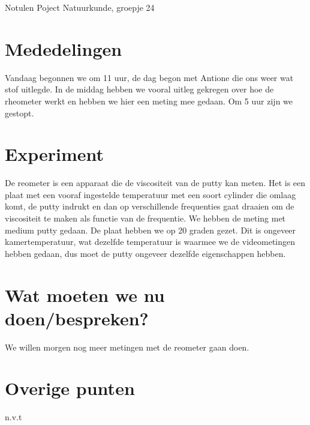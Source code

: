 \documentclass[11pt,a4paper]{article}
\begin{document}
\begin{Minutes}{Notulen Poject Natuurkunde, groepje 24}


\endtime{}
\location{}




\maketitle



\newpage


\section{Mededelingen} 
Vandaag begonnen we om 11 uur, de dag begon met Antione die ons weer wat stof uitlegde. In de middag hebben we vooral uitleg gekregen over hoe de rheometer werkt en hebben we hier een meting mee gedaan. Om 5 uur zijn we gestopt.

\section{Experiment}
De reometer is een apparaat die de viscositeit van de putty kan meten. Het is een plaat met een vooraf ingestelde temperatuur met een soort cylinder die omlaag komt, de putty indrukt en dan op verschillende frequenties gaat draaien om de viscositeit te maken als functie van de frequentie. We hebben de meting met medium putty gedaan. De plaat hebben we op 20 graden gezet. Dit is ongeveer kamertemperatuur, wat dezelfde temperatuur is waarmee we de videometingen hebben gedaan, dus moet de putty ongeveer dezelfde eigenschappen hebben.


\section{Wat moeten we nu doen/bespreken?}
We willen morgen nog meer metingen met de reometer gaan doen.

\section{Overige punten}
n.v.t

\end{Minutes}
\end{document}

